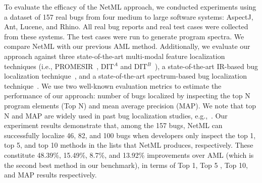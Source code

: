 To evaluate the efficacy of the NetML approach, we conducted experiments using a dataset of 157 real bugs from four medium to large software systems: AspectJ, Ant, Lucene, and Rhino. All real bug reports and real test cases were collected from these systems. The test cases were run to generate program spectra. We compare NetML with our previous AML method. Additionally, we evaluate our approach against three  state-of-the-art multi-modal feature localization techniques (i.e., PROMESIR~\cite{PoshyvanykGMAR07}, DIT$^{A}$ and DIT$^{B}$~\cite{DitRP13}), a state-of-the-art IR-based bug localization technique~\cite{YeBL14}, and a state-of-the-art spectrum-based bug localization technique~\cite{XuanM14}. We use two well-known evaluation metrics to estimate the performance of our approach: number of bugs localized by inspecting the top N program elements (Top N) and mean average precision (MAP). We note that top N and MAP are widely used in past bug localization studies, e.g.,~\cite{Rao:2011:RSL:1985441.1985451,Sisman:2012:IVH:2664446.2664454,Zhou:2012:BFM:2337223.2337226,SahaLKP13}.
Our experiment results demonstrate that, among the 157 bugs, NetML can successfully localize 46, 82, and 100 bugs when developers only inspect the top 1, top 5, and top 10 methods in the lists that NetML produces, respectively. These constitute 48.39\%, 15.49\%, 8.7\%, and 13.92\% improvements over AML (which is the second best method in our benchmark), in terms of Top 1, Top 5 , Top 10, and MAP results respectively.


